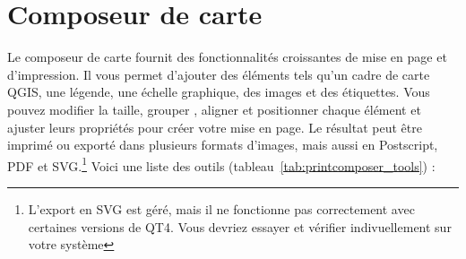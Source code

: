 \section{Composeur de carte}\label{label_printcomposer}


Le composeur de carte fournit des fonctionnalités croissantes de mise en page et d'impression. Il vous permet d'ajouter des éléments tels qu'un cadre de carte QGIS, une légende, une échelle graphique, des images et des étiquettes. Vous pouvez modifier la taille, grouper , aligner et positionner chaque élément et ajuster leurs propriétés pour créer votre mise en page. Le résultat peut être imprimé ou exporté dans plusieurs formats d'images, mais aussi en Postscript, PDF et SVG.\footnote{L'export en SVG est géré, mais il ne fonctionne pas correctement avec certaines versions de QT4. Vous devriez essayer et vérifier indivuellement sur votre système} Voici une liste des outils (tableau~\ref{tab:printcomposer_tools}) :

